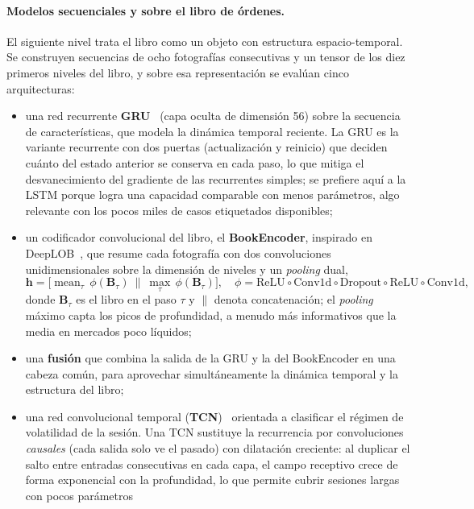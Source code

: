 \paragraph{Modelos secuenciales y sobre el libro de órdenes.} El siguiente nivel trata el
libro como un objeto con estructura espacio-temporal. Se construyen secuencias de ocho
fotografías consecutivas y un tensor de los diez primeros niveles del libro, y sobre esa
representación se evalúan cinco arquitecturas:
\begin{itemize}[noitemsep]
\item una red recurrente \textbf{GRU}~\cite{cho2014gru} (capa oculta de dimensión 56) sobre
la secuencia de características, que modela la dinámica temporal reciente. La GRU es la
variante recurrente con dos puertas (actualización y reinicio) que deciden cuánto del estado
anterior se conserva en cada paso, lo que mitiga el desvanecimiento del gradiente de las
recurrentes simples; se prefiere aquí a la LSTM porque logra una capacidad comparable con
menos parámetros, algo relevante con los pocos miles de casos etiquetados disponibles;
\item un codificador convolucional del libro, el \textbf{BookEncoder}, inspirado en
DeepLOB~\cite{zhang2019deeplob,tsantekidis2017}, que resume cada fotografía con dos
convoluciones unidimensionales sobre la dimensión de niveles y un \emph{pooling} dual,
\begin{equation}
\mathbf{h} = \big[\operatorname{mean}_\tau\, \phi(\mathbf{B}_\tau)\ \|\ \operatorname{max}_\tau\, \phi(\mathbf{B}_\tau)\big],
\quad
\phi = \text{ReLU}\!\circ\!\text{Conv1d}\!\circ\!\text{Dropout}\!\circ\!\text{ReLU}\!\circ\!\text{Conv1d},
\end{equation}
donde $\mathbf{B}_\tau$ es el libro en el paso $\tau$ y $\|$ denota concatenación; el
\emph{pooling} máximo capta los picos de profundidad, a menudo más informativos que la media
en mercados poco líquidos;
\item una \textbf{fusión} que combina la salida de la GRU y la del BookEncoder en una cabeza
común, para aprovechar simultáneamente la dinámica temporal y la estructura del libro;
\item una red convolucional temporal (\textbf{TCN})~\cite{bai2018tcn} orientada a clasificar
el régimen de volatilidad de la sesión. Una TCN sustituye la recurrencia por convoluciones
\emph{causales} (cada salida solo ve el pasado) con dilatación creciente: al duplicar el
salto entre entradas consecutivas en cada capa, el campo receptivo crece de forma
exponencial con la profundidad, lo que permite cubrir sesiones largas con pocos parámetros

\end{itemize}
